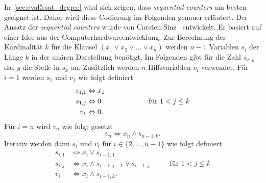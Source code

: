 In~\cref{sec:eval5:sat_degree} wird sich zeigen, dass \emph{sequential counters} am besten geeignet ist.
Daher wird diese Codierung im Folgenden genauer erläutert.
Der Ansatz der \emph{sequential counters} wurde von Carsten Sinz~\cite{sequential_counters} entwickelt.
Er basiert auf einer Idee aus der Computerhardwareentwicklung.
Zur Berechnung der Kardinalität \(k\) für die Klausel \((x_1 \lor x_2 \lor \ldots \lor x_n)\) werden \(n-1\) Variablen \(s_i\) der Länge \(k\) in der unären Darstellung benötigt.
Im Folgenden gibt für die Zahl \(s_{x,y}\) das \(y\) die Stelle in \(s_x\) an.
Zusätzlich werden \(n\) Hilfsvariablen \(v_i\) verwendet.
Für \(i = 1\) werden \(s_1\) und \(v_1\) wie folgt definiert
\begin{align*}
s_{1,1} &\Leftrightarrow x_1 \\
s_{1,j} &\Leftrightarrow 0 \hspace{2cm} &\text{für } 1 < j \leq k \\
v_{1} &\Leftrightarrow 0.
\end{align*}
Für \(i=n\) wird \(v_n\) wie folgt gesetzt
\[v_n \iff x_n \land s_{n-1,k}.\]
Iterativ werden dann \(s_i\) und \(v_i\) für \(i \in \{2, \ldots, n-1\}\) wie folgt definiert
\begin{align*}
s_{i,1} &\Leftrightarrow x_i \lor s_{i-1,1} \\
s_{i,j} &\Leftrightarrow x_i \land s_{i-1,j-1} \lor s_{i-1,j} \qquad &\text{für } 1 < j \leq k \\[6pt]
v_i &\Leftrightarrow x_i \land s_{i-1,k}.
\end{align*}

